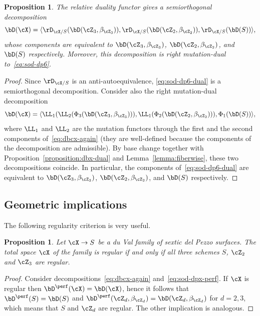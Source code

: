 \documentclass[11pt]{amsart}
\theoremstyle{plain}
\newtheorem{proposition}[theorem]{Proposition}
\theoremstyle{definition}
\theoremstyle{remark}
\begin{document}
\begin{proposition}
\label{proposition:sod-dual}
The relative duality functor gives a semiorthogonal decomposition
\begin{equation}
\label{eq:sod-dp6-dual}
\bD(\cX) = \langle \rD_{\cX/S}(\bD(\cZ_3,\beta_{\cZ_3})), \rD_{\cX/S}(\bD(\cZ_2,\beta_{\cZ_2})), \rD_{\cX/S}(\bD(S)) \rangle,
\end{equation}
whose components are equivalent to $\bD(\cZ_3,\beta_{\cZ_3})$, $\bD(\cZ_2,\beta_{\cZ_2})$, and $\bD(S)$ respectively.
Moreover, this decomposition is right mutation-dual to~\eqref{eq:sod-dp6}.
\end{proposition}
\begin{proof}
Since $\rD_{\cX/S}$ is an anti-autoequivalence, \eqref{eq:sod-dp6-dual} is a semiorthogonal decomposition.
Consider also the right mutation-dual decomposition
\begin{equation*}
\bD(\cX) = \langle \LL_1(\LL_2(\Phi_3(\bD(\cZ_3,\beta_{\cZ_3}))), \LL_1(\Phi_2(\bD(\cZ_2,\beta_{\cZ_2}))), \Phi_1(\bD(S)) \rangle,
\end{equation*}
where $\LL_1$ and $\LL_2$ are the mutation functors through the first and the second components of~\eqref{eq:dbcx-again} 
(they are well-defined because the components of the decomposition are admissible).
By base change together with Proposition~\ref{proposition:dbx-dual} and Lemma~\ref{lemma:fiberwise}, these two decompositions coincide.
In particular, the components of~\eqref{eq:sod-dp6-dual} are equivalent 
to $\bD(\cZ_3,\beta_{\cZ_3})$, $\bD(\cZ_2,\beta_{\cZ_2})$, and $\bD(S)$ respectively.
\end{proof}

\subsection{Geometric implications}

The following regularity criterion is very useful.

\begin{proposition}
\label{proposition:smoothness}
Let $\cX \to S$ be a du Val family of sextic del Pezzo surfaces.
The total space $\cX$ of the family is regular if and only if all three schemes $S$, $\cZ_2$ and $\cZ_3$ are regular.
\end{proposition}
\begin{proof}
Consider decompositions~\eqref{eq:dbcx-again} and~\eqref{eq:sod-dpx-perf}.
If $\cX$ is regular then $\bD^\perf(\cX) = \bD(\cX)$, hence it follows that $\bD^\perf(S) = \bD(S)$ and $\bD^\perf(\cZ_d,\beta_{\cZ_d}) = \bD(\cZ_d,\beta_{\cZ_d})$ for $d = 2,3$,
which means that $S$ and $\cZ_d$ are regular. 
The other implication is analogous.
\end{proof}
\end{document}
